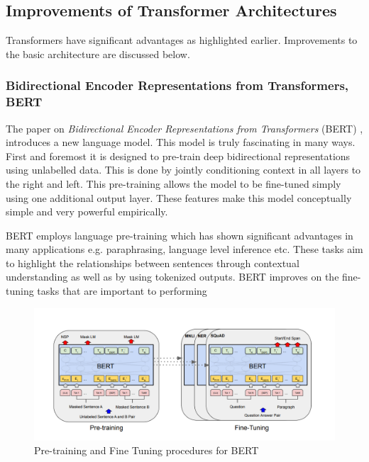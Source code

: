 \documentclass[a4paper,12pt]{report}
\begin{document}
		\subsection{Improvements of Transformer Architectures}\label{232}

            Transformers have significant advantages as highlighted earlier. Improvements to the basic architecture are discussed below.
		\subsubsection{Bidirectional Encoder Representations from Transformers, BERT}\label{2321}

			The paper on \textit{Bidirectional Encoder Representations from Transformers} (BERT) \citep{bert}, introduces a new language model. This model is truly fascinating in many ways. First and foremost it is designed to pre-train deep bidirectional representations using unlabelled data. This is done by jointly conditioning context in all layers to the right and left. This pre-training allows the model to be fine-tuned simply using one additional output layer. These features make this model conceptually simple and very powerful empirically.

			BERT employs language pre-training \citep{dai, deepContextualized, radford2018improving} which has shown significant advantages in many applications e.g. paraphrasing, language level inference etc. These tasks aim to highlight the relationships between sentences through contextual understanding as well as by using tokenized outputs. BERT improves on the fine-tuning tasks that are important to performing
			\begin{figure}[h!]
				\centering
				\includegraphics[scale=0.35]{../images/BERT.png}
				\caption{Pre-training and Fine Tuning procedures for BERT \citep{bert}}\label{bertPretraining}
			\end{figure}
\end{document}
